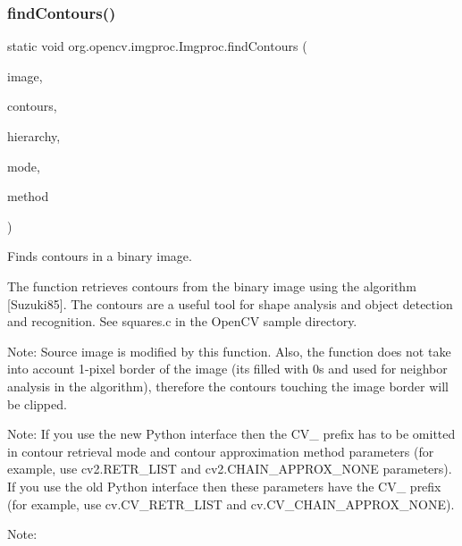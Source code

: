 \subsubsection{\texorpdfstring{find\+Contours()}{findContours()}\hspace{0.1cm}{\footnotesize\ttfamily [2/2]}}
{\footnotesize\ttfamily static void org.\+opencv.\+imgproc.\+Imgproc.\+find\+Contours (\begin{DoxyParamCaption}\item[{\mbox{\hyperlink{classorg_1_1opencv_1_1core_1_1_mat}{Mat}}}]{image,  }\item[{List$<$ \mbox{\hyperlink{classorg_1_1opencv_1_1core_1_1_mat_of_point}{Mat\+Of\+Point}} $>$}]{contours,  }\item[{\mbox{\hyperlink{classorg_1_1opencv_1_1core_1_1_mat}{Mat}}}]{hierarchy,  }\item[{int}]{mode,  }\item[{int}]{method }\end{DoxyParamCaption})\hspace{0.3cm}{\ttfamily [static]}}

Finds contours in a binary image.

The function retrieves contours from the binary image using the algorithm \mbox{[}Suzuki85\mbox{]}. The contours are a useful tool for shape analysis and object detection and recognition. See {\ttfamily squares.\+c} in the Open\+CV sample directory.

Note\+: Source {\ttfamily image} is modified by this function. Also, the function does not take into account 1-\/pixel border of the image (it\textquotesingle{}s filled with 0\textquotesingle{}s and used for neighbor analysis in the algorithm), therefore the contours touching the image border will be clipped.

Note\+: If you use the new Python interface then the {\ttfamily C\+V\+\_\+} prefix has to be omitted in contour retrieval mode and contour approximation method parameters (for example, use {\ttfamily cv2.\+R\+E\+T\+R\+\_\+\+L\+I\+ST} and {\ttfamily cv2.\+C\+H\+A\+I\+N\+\_\+\+A\+P\+P\+R\+O\+X\+\_\+\+N\+O\+NE} parameters). If you use the old Python interface then these parameters have the {\ttfamily C\+V\+\_\+} prefix (for example, use {\ttfamily cv.\+C\+V\+\_\+\+R\+E\+T\+R\+\_\+\+L\+I\+ST} and {\ttfamily cv.\+C\+V\+\_\+\+C\+H\+A\+I\+N\+\_\+\+A\+P\+P\+R\+O\+X\+\_\+\+N\+O\+NE}).

Note\+:


